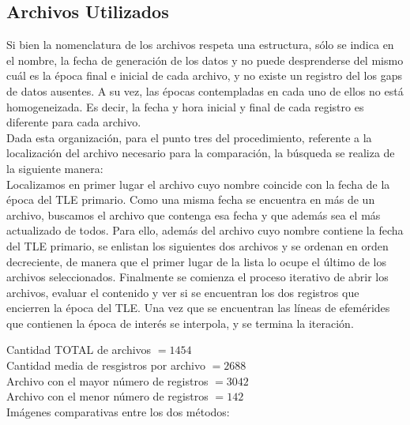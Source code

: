\subsection{Archivos Utilizados}
Si bien la nomenclatura de los archivos respeta una estructura, s\'olo se indica en el nombre, la fecha de generaci\'on de los datos y no puede desprenderse del mismo cu\'al es la \'epoca final e inicial de cada archivo, y no existe un registro del los gaps de datos ausentes. A su vez, las \'epocas contempladas en cada uno de ellos no está homogeneizada. Es decir, la fecha y hora inicial y final de cada registro es diferente para cada archivo.\\
Dada esta organizaci\'on, para el punto tres del procedimiento, referente a la localizaci\'on del archivo necesario para la comparaci\'on, la b\'usqueda se realiza de la siguiente manera:\\
Localizamos en primer lugar el archivo cuyo nombre coincide con la fecha de la \'epoca del TLE primario.
Como una misma fecha se encuentra en m\'as de un archivo, buscamos el archivo que contenga esa fecha y que adem\'as sea el m\'as actualizado de todos. Para ello, además del archivo cuyo nombre contiene la fecha del TLE primario, se enlistan los siguientes dos archivos y se ordenan en orden decreciente, de manera que el primer lugar de la lista lo ocupe el \'ultimo de los archivos seleccionados. Finalmente se comienza el proceso iterativo de abrir los archivos, evaluar el contenido y ver si se encuentran los dos registros que encierren la \'epoca del TLE.
Una vez que se encuentran las l\'ineas de efem\'erides que contienen la \'epoca de inter\'es se interpola, y se termina la iteraci\'on.

\noindent
Cantidad TOTAL de archivos $=  1454$\\
Cantidad media de resgistros por archivo $=  2688$\\
Archivo con el mayor n\'umero de registros $=  3042$\\
Archivo con el menor n\'umero de registros $=  142$\\

Im\'agenes comparativas entre los dos m\'etodos:\\

